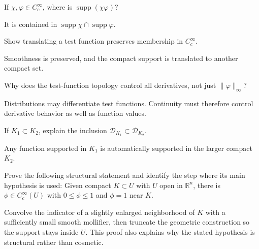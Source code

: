 \begin{problem}\label{prob:iii15-problem-05}
If \(\chi,\varphi\in C_c^\infty\), where is \(\operatorname{supp}(\chi\varphi)\)?
\end{problem}
\begin{solution}
It is contained in
\(\operatorname{supp}\chi\cap\operatorname{supp}\varphi\).
\end{solution}

\begin{problem}\label{prob:iii15-problem-06}
Show translating a test function preserves membership in \(C_c^\infty\).
\end{problem}
\begin{solution}
Smoothness is preserved, and the compact support is translated to another
compact set.
\end{solution}

\begin{problem}\label{prob:iii15-problem-07}
Why does the test-function topology control all derivatives, not just \(\|\varphi\|_\infty\)?
\end{problem}
\begin{solution}
Distributions may differentiate test functions. Continuity must therefore
control derivative behavior as well as function values.
\end{solution}

\begin{problem}\label{prob:iii15-problem-08}
If \(K_1\subset K_2\), explain the inclusion \(\mathcal D_{K_1}\subset\mathcal D_{K_2}\).
\end{problem}
\begin{solution}
Any function supported in \(K_1\) is automatically supported in the larger
compact \(K_2\).
\end{solution}

\begin{problem}\label{prob:iii15-problem-09}
Prove the following structural statement and identify the step where its main hypothesis is used: Given compact $K\subset U$ with $U$ open in $\mathbb R^n$, there is $\phi\in C_c^\infty(U)$ with $0\le\phi\le1$ and $\phi=1$ near $K$.
\end{problem}
\begin{solution}
Convolve the indicator of a slightly enlarged neighborhood of $K$ with a sufficiently small smooth mollifier, then truncate the geometric construction so the support stays inside $U$. This proof also explains why the stated hypothesis is structural rather than cosmetic.
\end{solution}

